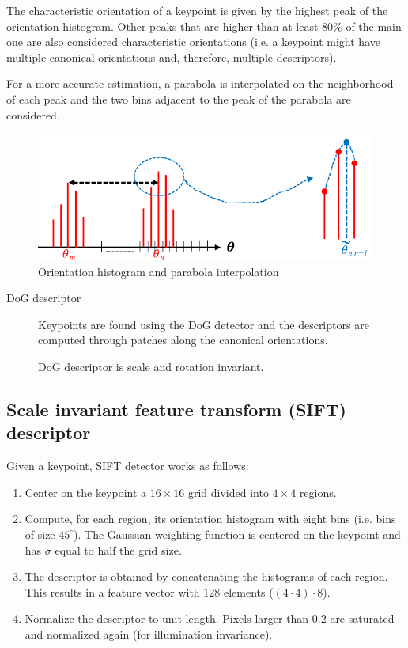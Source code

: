 \begin{description}
\begin{description}
                The characteristic orientation of a keypoint is given by the highest peak of the orientation histogram.
                Other peaks that are higher than at least $80\%$ of the main one are also considered characteristic orientations
                (i.e. a keypoint might have multiple canonical orientations and, therefore, multiple descriptors).

                For a more accurate estimation, a parabola is interpolated on the neighborhood of each peak and
                the two bins adjacent to the peak of the parabola are considered.

                \begin{figure}[H]
                    \centering
                    \includegraphics[width=0.45\linewidth]{./img/_canonical_histogram.pdf}
                    \caption{Orientation histogram and parabola interpolation}
                \end{figure}
        \end{description}
\end{description}

\begin{description}
    \item[DoG descriptor] 
        Keypoints are found using the DoG detector and the descriptors are computed through patches along the canonical orientations.

        \begin{remark}
            DoG descriptor is scale and rotation invariant.
        \end{remark}
\end{description}


\subsection{Scale invariant feature transform (SIFT) descriptor}

Given a keypoint, SIFT detector works as follows:
\begin{enumerate}
    \item Center on the keypoint a $16 \times 16$ grid divided into $4 \times 4$ regions.
    \item Compute, for each region, its orientation histogram with eight bins (i.e. bins of size $45^\circ$).
        The Gaussian weighting function is centered on the keypoint and has $\sigma$ equal to half the grid size.
    \item The descriptor is obtained by concatenating the histograms of each region. 
        This results in a feature vector with $128$ elements ($(4 \cdot 4) \cdot 8$).
    \item Normalize the descriptor to unit length. Pixels larger than $0.2$ are saturated and normalized again (for illumination invariance).
\end{enumerate}

